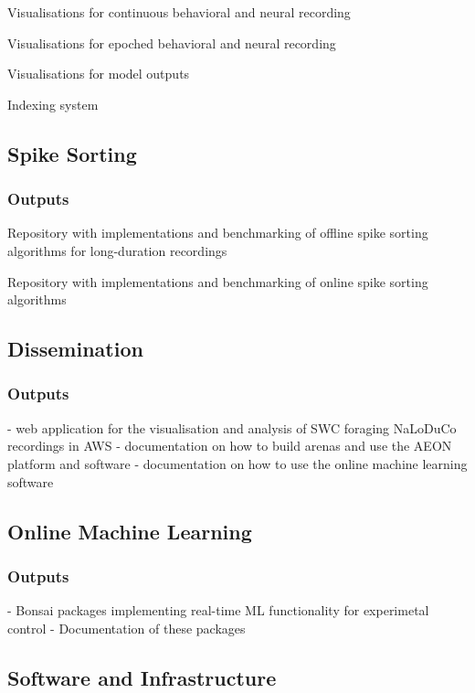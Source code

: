 \documentclass[12pt]{article}
\begin{document}
Visualisations for continuous behavioral and neural recording

Visualisations for epoched behavioral and neural recording

Visualisations for model outputs

Indexing system

\subsection{Spike Sorting}

\subsubsection{Outputs}

Repository with implementations and benchmarking of offline spike sorting algorithms for long-duration recordings

Repository with implementations and benchmarking of online spike sorting algorithms

\subsection{Dissemination}
\label{sec:dissemination}

\subsubsection{Outputs}

- web application for the visualisation and analysis of SWC foraging NaLoDuCo recordings in AWS
- documentation on how to build arenas and use the AEON platform and software
- documentation on how to use the online machine learning software

\subsection{Online Machine Learning}

\subsubsection{Outputs}

- Bonsai packages implementing real-time ML functionality for experimetal control
- Documentation of these packages

\subsection{Software and Infrastructure}
\end{document}
